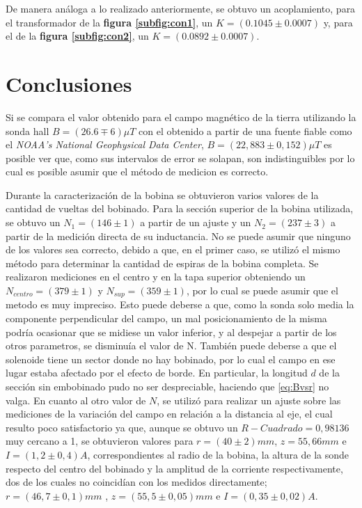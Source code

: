 \documentclass[11pt,a4paper]{article}
\begin{document}
De manera análoga a lo realizado anteriormente, se obtuvo un acoplamiento, para el transformador de la \textbf{figura \ref{subfig:con1}}, un $K=(0.1045\pm 0.0007)$ y, para el de la \textbf{figura \ref{subfig:con2}}, un $K=(0.0892 \pm 0.0007)$.



\section{Conclusiones}
\label{sec:conclusiones}
Si se compara el valor obtenido para el campo magnético de la tierra utilizando la sonda hall $B=(26.6\mp 6) \mu T$ con el obtenido a partir de una fuente fiable como el \textit{NOAA's National Geophysical Data Center}, $B = (22,883 \pm 0,152)\mu T$ es posible ver que, como sus intervalos de error se solapan, son indistinguibles por lo cual es posible asumir que el método de medicion es correcto.

Durante la caracterización de la bobina se obtuvieron varios valores de la cantidad de vueltas del bobinado. Para la sección superior de la bobina utilizada, se obtuvo un $N_{1}= (146 \pm 1)$ a partir de un ajuste y un $N_{2} = (237 \pm 3)$ a partir de la medición directa de su inductancia. No se puede asumir que ninguno de los valores sea correcto, debido a que, en el primer caso,  se utilizó el mismo método para determinar la cantidad de espiras de la bobina completa. Se realizaron mediciones en el centro y en la tapa superior obteniendo un $N_{centro} = (379 \pm 1)$ y $N_{sup} = (359 \pm 1)$, por lo cual se puede asumir que el metodo es muy impreciso. Esto puede deberse a que, como la sonda solo media la componente perpendicular del campo, un mal posicionamiento de la misma podría ocasionar que se midiese un valor inferior, y al despejar a partir de los otros parametros, se disminuía el valor de N. También puede deberse a que el solenoide tiene un sector donde no hay bobinado, por lo cual el campo en ese lugar estaba afectado por el efecto de borde. En particular, la longitud $d$ de la sección sin embobinado pudo no ser despreciable, haciendo que \eqref{eq:Bvsr} no valga. En cuanto al otro valor de $N$, se utilizó para realizar un ajuste sobre las mediciones de la variación del campo en relación a la distancia al eje, el cual resulto poco satisfactorio ya que, aunque se obtuvo un $R-Cuadrado = 0,98136$ muy cercano a 1, se obtuvieron valores para $r= (40 \pm 2)mm$, $z= 55,66 mm$ e $I= (1,2 \pm 0,4)A$, correspondientes al radio de la bobina, la altura de la sonde respecto del centro del bobinado y la amplitud de la corriente respectivamente, dos de los cuales no coincidían con los medidos directamente; $r=(46,7 \pm 0,1)mm$ , $z = (55,5 \pm 0,05) mm$ e $I= (0,35 \pm 0,02)A$.
\end{document}

